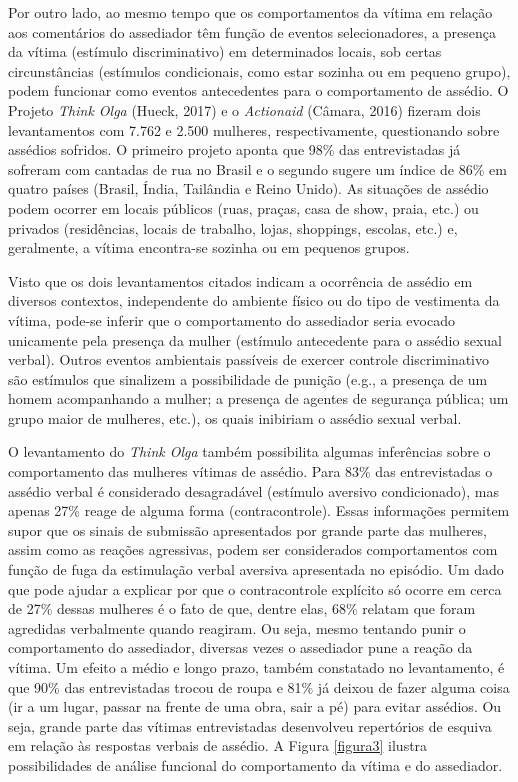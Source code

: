 Por outro lado, ao mesmo tempo que os comportamentos da vítima em relação aos comentários do assediador têm função de eventos selecionadores, a presença da vítima (estímulo discriminativo) em determinados locais, sob certas circunstâncias (estímulos condicionais, como estar sozinha ou em pequeno grupo), podem funcionar como eventos antecedentes para o comportamento de assédio. O Projeto \textit{Think Olga} (Hueck, 2017) e o \textit{Actionaid} (Câmara, 2016) fizeram dois levantamentos com 7.762 e 2.500 mulheres, respectivamente, questionando sobre assédios sofridos. O primeiro projeto aponta que 98\% das entrevistadas já sofreram com cantadas de rua no Brasil e o segundo sugere um índice de 86\% em quatro países (Brasil, Índia, Tailândia e Reino Unido). As situações de assédio podem ocorrer em locais públicos (ruas, praças, casa de show, praia, etc.) ou privados (residências, locais de trabalho, lojas, shoppings, escolas, etc.) e, geralmente, a vítima encontra-se sozinha ou em pequenos grupos.

Visto que os dois levantamentos citados indicam a ocorrência de assédio em diversos contextos, independente do ambiente físico ou do tipo de vestimenta da vítima, pode-se inferir que o comportamento do assediador seria evocado unicamente pela presença da mulher (estímulo antecedente para o assédio sexual verbal). Outros eventos ambientais passíveis de exercer controle discriminativo são estímulos que sinalizem a possibilidade de punição (e.g., a presença de um homem acompanhando a mulher; a presença de agentes de segurança pública; um grupo maior de mulheres, etc.), os quais inibiriam o assédio sexual verbal.

O levantamento do \textit{Think Olga} também possibilita algumas inferências sobre o comportamento das mulheres vítimas de assédio. Para 83\% das entrevistadas o assédio verbal é considerado desagradável (estímulo aversivo condicionado), mas apenas 27\% reage de alguma forma (contracontrole). Essas informações permitem supor que os sinais de submissão apresentados por grande parte das mulheres, assim como as reações agressivas, podem ser considerados comportamentos com função de fuga da estimulação verbal aversiva apresentada no episódio. Um dado que pode ajudar a explicar por que o contracontrole explícito só ocorre em cerca de 27\% dessas mulheres é o fato de que, dentre elas, 68\% relatam que foram agredidas verbalmente quando reagiram. Ou seja, mesmo tentando punir o comportamento do assediador, diversas vezes o assediador pune a reação da vítima. Um efeito a médio e longo prazo, também constatado no levantamento, é que 90\% das entrevistadas trocou de roupa e 81\% já deixou de fazer alguma coisa (ir a um lugar, passar na frente de uma obra, sair a pé) para evitar assédios. Ou seja, grande parte das vítimas entrevistadas desenvolveu repertórios de esquiva em relação às respostas verbais de assédio. A Figura \ref{figura3} ilustra possibilidades de análise funcional do comportamento da vítima e do assediador.


